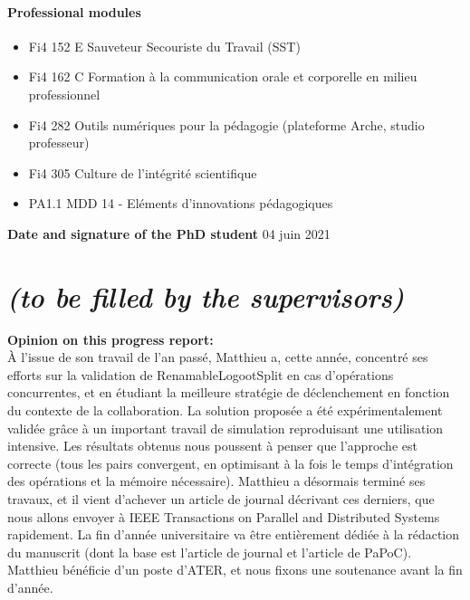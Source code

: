 \documentclass[12pt]{article}
\begin{document}
\paragraph{\footnotesize Professional modules}
  \begin{itemize}
      \itemsep0em
      \item Fi4 152 E Sauveteur Secouriste du Travail (SST)
      \item Fi4 162 C Formation à la communication orale et corporelle en milieu professionnel
      \item Fi4 282 Outils numériques pour la pédagogie (plateforme Arche, studio professeur)
      \item Fi4 305 Culture de l’intégrité scientifique
      \item PA1.1 MDD 14 - Eléments d’innovations pédagogiques
  \end{itemize}

\noindent\textbf{Date and signature of the PhD student}
04 juin 2021

\newpage
\section*{ \textit{\small (to be filled by the supervisors)}}

\noindent\textbf{Opinion on this progress report:}\\
À l'issue de son travail de l'an passé, Matthieu a, cette année, concentré ses efforts sur la validation de RenamableLogootSplit en cas d'opérations concurrentes, et en étudiant la meilleure stratégie de déclenchement en fonction du contexte de la collaboration. La solution proposée a été expérimentalement validée grâce à un important travail de simulation reproduisant une utilisation intensive. Les résultats obtenus nous poussent à penser que l'approche est correcte (tous les pairs convergent, en optimisant à la fois le temps d'intégration des opérations et la mémoire nécessaire). Matthieu a désormais terminé ses travaux, et il vient d'achever un article de journal décrivant ces derniers, que nous allons envoyer à IEEE Transactions on Parallel and Distributed Systems rapidement.
La fin d'année universitaire va être entièrement dédiée à la rédaction du manuscrit (dont la base est l'article de journal et l'article de PaPoC). Matthieu bénéficie d'un poste d'ATER, et nous fixons une soutenance avant la fin d’année.
\\
\end{document}
